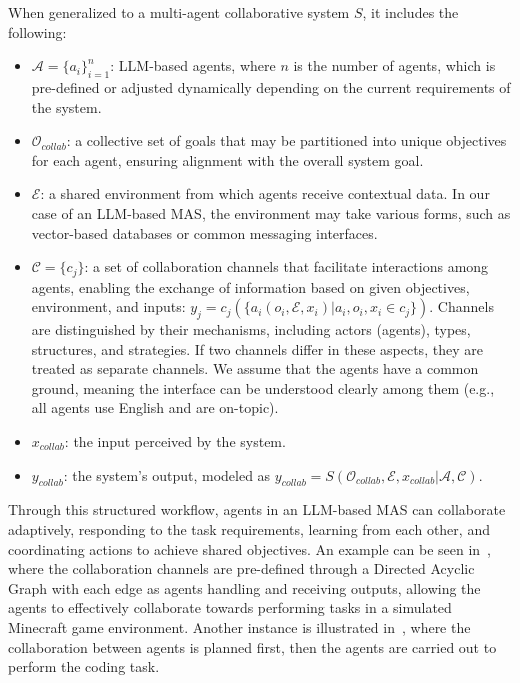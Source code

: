 \documentclass[acmsmall,nonacm]{acmart}
\begin{document}
        When generalized to a multi-agent collaborative system $S$, it includes the following:
        \begin{itemize}
            \item $\mathcal{A}=\{a_i\}_{i=1}^n$: LLM-based agents, where $n$ is the number of agents, which is pre-defined or adjusted dynamically depending on the current requirements of the system.
            \item $\mathcal{O}_{collab}$: a collective set of goals that may be partitioned into unique objectives for each agent, ensuring alignment with the overall system goal.
            \item $\mathcal{E}$: a shared environment from which agents receive contextual data. In our case of an LLM-based MAS, the environment may take various forms, such as vector-based databases or common messaging interfaces.
            \item $\mathcal{C}=\{{c}_{j}\}$: a set of collaboration channels that facilitate interactions among agents, enabling the exchange of information based on given objectives, environment, and inputs: $y_j = c_j(\{a_{i} (o_i, \mathcal{E}, x_i) | a_{i}, o_i, x_{i} \in c_j \} )$. Channels are distinguished by their mechanisms, including actors (agents), types, structures, and strategies. If two channels differ in these aspects, they are treated as separate channels. We assume that the agents have a common ground, meaning the interface can be understood clearly among them (e.g., all agents use English and are on-topic). %
            \item $x_{collab}$: the input perceived by the system.
            \item $y_{collab}$: the system’s output, modeled as $y_{collab}=S(\mathcal{O}_{collab},\mathcal{E},x_{collab}|\mathcal{A},\mathcal{C})$.
        \end{itemize}

    Through this structured workflow, agents in an LLM-based MAS can collaborate adaptively, responding to the task requirements, learning from each other, and coordinating actions to achieve shared objectives. An example can be seen in~\cite{dong-etal-2024-villageragent}, where the collaboration channels are pre-defined through a Directed Acyclic Graph with each edge as agents handling and receiving outputs, allowing the agents to effectively collaborate towards performing tasks in a simulated Minecraft game environment. Another instance is illustrated in~\cite{10.1145/3672456}, where the collaboration between agents is planned first, then the agents are carried out to perform the coding task.
\end{document}
